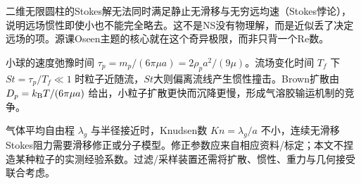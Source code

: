 二维无限圆柱的Stokes解无法同时满足静止无滑移与无穷远均速（Stokes悖论），说明远场惯性即使小也不能完全略去。这不是NS没有物理解，而是近似丢了决定远场的项。源课Oseen主题的核心就在这个奇异极限，而非只背一个Re数。

小球的速度弛豫时间 $\tau_p=m_p/(6\pi\mu a)=2\rho_pa^2/(9\mu)$。流场变化时间 $T_f$ 下 $St=\tau_p/T_f\ll1$ 时粒子近随流，$St$大则偏离流线产生惯性撞击。Brown扩散由 $D_p=k_{\mathrm B} T/(6\pi\mu a)$ 给出，小粒子扩散更快而沉降更慢，形成气溶胶输运机制的竞争。

气体平均自由程 $\lambda_g$ 与半径接近时，Knudsen数 $Kn=\lambda_g/a$ 不小，连续无滑移Stokes阻力需要滑移修正或分子模型。修正参数应来自相应资料/标定；本文不捏造某种粒子的实测经验系数。过滤/采样装置还需将扩散、惯性、重力与几何接受联合考虑。
